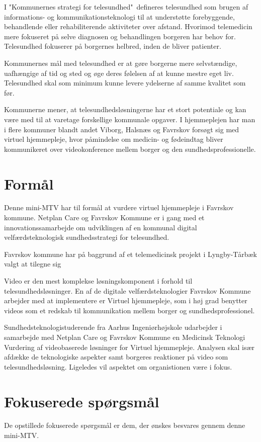 I "Kommunernes strategi for telesundhed"\ defineres telesundhed som brugen af informations- og kommunikationsteknologi til at understøtte forebyggende, behandlende eller rehabiliterende aktiviteter over afstand. Hvorimod telemedicin mere fokuseret på selve diagnosen og behandlingen borgeren har behov for. Telesundhed fokuserer på borgernes helbred, inden de bliver patienter.\cite{KLs}\cite{sundhed}

Kommunernes mål med telesundhed er at gøre borgerne mere selvstændige, uafhængige af tid og sted og øge deres følelsen af at kunne mestre eget liv. Telesundhed skal som minimum kunne levere ydelserne af samme kvalitet som før.\cite{KLs}

Kommunerne mener, at telesundhedsløsningerne har et stort potentiale og kan være med til at varetage forskellige kommunale opgaver. I hjemmeplejen har man i flere kommuner blandt andet Viborg\cite{viborg}, Halsnæs\cite{hals} og Favrskov forsøgt sig med virtuel hjemmepleje, hvor påmindelse om medicin- og fødeindtag bliver kommunikeret over videokonference mellem borger og den sundhedsprofessionelle. 

\section{Formål}
Denne mini-MTV har til formål at vurdere virtuel hjemmepleje i Favrskov kommune. Netplan Care og Favrskov Kommune er i gang med et innovationssamarbejde om udviklingen af en kommunal digital velfærdsteknologisk sundhedsstrategi for telesundhed. 

Favrskov kommune har på baggrund af et telemedicinsk projekt i Lyngby-Tårbæk valgt at tilegne sig    

Video er den mest komplekse løsningskomponent i forhold til telesundhedsløsninger. En af de digitale velfærdsteknologier Favrskov Kommune arbejder med at implementere er Virtuel hjemmepleje, som i høj grad benytter videos som et redskab til kommunikation mellem borger og sundhedsprofessionel. 

Sundhedsteknologistuderende fra Aarhus Ingeniørhøjskole udarbejder i samarbejde med Netplan Care og Favrskov Kommune en Medicinsk Teknologi Vurdering af videobaserede løsninger for Virtuel hjemmepleje. Analysen skal især afdække de teknologiske aspekter samt borgeres reaktioner på video som telesundhedsløsning. Ligeledes vil aspektet om organistionen være i fokus. 

\section{Fokuserede spørgsmål}
De opstillede fokuserede spørgsmål er dem, der ønskes besvares gennem denne mini-MTV. 


